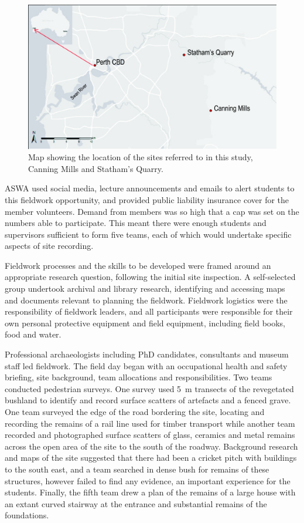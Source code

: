 \documentclass{ijsra}
\begin{document}
   	\begin{figure} %
   		\includegraphics[width=\linewidth]{figures/Fyfe-Figure01}
   		\caption{Map showing the location of the sites referred to in this study, Canning Mills and Statham’s Quarry.}
   		\centering
   		\label{fig:Fyfe-Figure01}
   	\end{figure}

ASWA used social media, lecture announcements and emails to alert students to this fieldwork opportunity, and provided public liability insurance cover for the member volunteers. 
Demand from members was so high that a cap was set on the numbers able to participate. 
This meant there were enough students and supervisors sufficient to form five teams, each of which would undertake specific aspects of site recording.

Fieldwork processes and the skills to be developed were framed around an appropriate research question, following the initial site inspection. A self-selected group undertook archival and library research, identifying and accessing maps and documents relevant to planning the fieldwork.
Fieldwork logistics were the responsibility of fieldwork leaders, and all participants were responsible for their own personal protective equipment and field equipment, including field books, food and water.

Professional archaeologists including PhD candidates, consultants and museum staff led fieldwork. 
The field day began with an occupational health and safety briefing, site background, team allocations and responsibilities. Two teams conducted pedestrian surveys. One survey used \SI{5}{\meter} transects of the revegetated bushland to identify and record surface scatters of artefacts and a fenced grave. 
One team surveyed the edge of the road bordering the site, locating and recording the remains of a rail line used for timber transport while another team recorded and photographed surface scatters of glass, ceramics and metal remains across the open area of the site to the south of the roadway. 
Background research and maps of the site suggested that there had been a cricket pitch with buildings to the south east, and a team searched in dense bush for remains of these structures, however failed to find any evidence, an important experience for the students. 
Finally, the fifth team drew a plan of the remains of a large house with an extant curved stairway at the entrance and substantial remains of the foundations.
\end{document}
